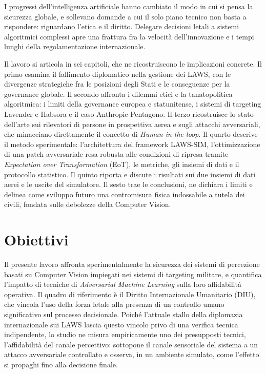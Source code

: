 \ifstampa\documentclass[a4paper,12pt,twoside,openright]{report}\else\documentclass[a4paper,12pt]{report}\fi
\newif\ifrevisione \revisionefalse
\DeclareRobustCommand{\rev}[1]{\ifrevisione{\color{blue!65!black}#1}\else#1\fi}
\begin{document}
 
I progressi dell'intelligenza artificiale hanno cambiato il modo in cui si pensa la sicurezza globale, e sollevano domande a cui il solo piano tecnico non basta a rispondere: riguardano l'etica e il diritto. Delegare decisioni letali a sistemi algoritmici complessi apre una frattura fra la velocità dell'innovazione e i tempi lunghi della regolamentazione internazionale.
 
Il lavoro si articola in sei capitoli, che ne ricostruiscono le implicazioni concrete. Il primo esamina il fallimento diplomatico nella gestione dei LAWS, con le divergenze strategiche fra le posizioni degli Stati e le conseguenze per la governance globale. \rev{Il secondo affronta i dilemmi etici e la tanatopolitica algoritmica: i limiti della governance europea e statunitense, i sistemi di targeting Lavender e Habsora e il caso Anthropic-Pentagono. Il terzo ricostruisce lo stato dell'arte sui rilevatori di persone in prospettiva aerea e sugli attacchi avversariali, che minacciano direttamente il concetto di \textit{Human-in-the-loop}. Il quarto descrive il metodo sperimentale: l'architettura del framework LAWS-SIM, l'ottimizzazione di una patch avversariale resa robusta alle condizioni di ripresa tramite \textit{Expectation over Transformation} (EoT), le metriche, gli insiemi di dati e il protocollo statistico. Il quinto riporta e discute i risultati sui due insiemi di dati aerei e le uscite del simulatore. Il sesto trae le conclusioni, ne dichiara i limiti e delinea come sviluppo futuro una contromisura fisica indossabile a tutela dei civili, fondata sulle debolezze della Computer Vision.}
 
\section*{Obiettivi}
Il presente lavoro affronta sperimentalmente la sicurezza dei sistemi di percezione basati su Computer Vision impiegati nei sistemi di targeting militare, e quantifica l'impatto di tecniche di \textit{Adversarial Machine Learning} sulla loro affidabilità operativa. Il quadro di riferimento è il Diritto Internazionale Umanitario (DIU), che vincola l'uso della forza letale alla presenza di un controllo umano significativo sul processo decisionale. Poiché l'attuale stallo della diplomazia internazionale sui LAWS lascia questo vincolo privo di una verifica tecnica indipendente, lo studio ne misura empiricamente \rev{uno dei presupposti tecnici, l'affidabilità del canale percettivo}: sottopone il canale sensoriale del sistema a un attacco avversariale controllato e osserva\rev{, in un ambiente simulato,} come l'effetto si propaghi fino alla decisione finale.
 
\end{document}
